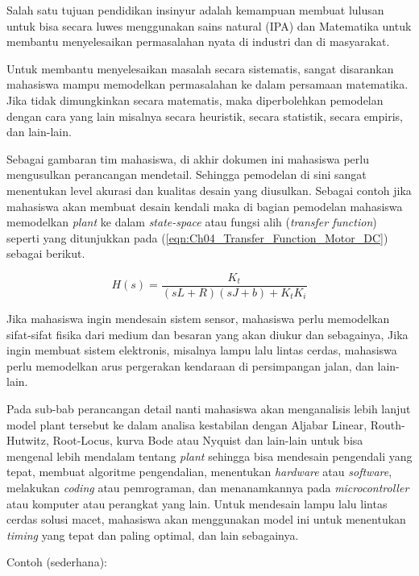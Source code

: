 Salah satu tujuan pendidikan insinyur adalah kemampuan membuat lulusan untuk bisa secara luwes menggunakan sains natural (IPA) dan Matematika untuk membantu menyelesaikan permasalahan nyata di industri dan di masyarakat.

Untuk membantu menyelesaikan masalah secara sistematis, sangat disarankan mahasiswa mampu memodelkan permasalahan ke dalam persamaan matematika. Jika tidak dimungkinkan secara matematis, maka diperbolehkan pemodelan dengan cara yang lain misalnya secara heuristik, secara statistik, secara empiris, dan lain-lain.

Sebagai gambaran tim mahasiswa, di akhir dokumen ini mahasiswa perlu mengusulkan perancangan mendetail. Sehingga pemodelan di sini sangat menentukan level akurasi dan kualitas desain yang diusulkan. Sebagai contoh jika mahasiswa akan membuat desain kendali maka di bagian pemodelan mahasiswa memodelkan \textit{plant} ke dalam \textit{state-space} atau fungsi alih (\textit{transfer function}) seperti yang ditunjukkan pada (\ref{eqn:Ch04_Transfer_Function_Motor_DC}) sebagai berikut.

\begin{equation}
    \label{eqn:Ch04_Transfer_Function_Motor_DC}
    H(s) = \dfrac{K_t}{\left( sL + R \right) \left( sJ + b \right) + K_t K_i}
\end{equation}

Jika mahasiswa ingin mendesain sistem sensor, mahasiswa perlu memodelkan sifat-sifat fisika dari medium dan besaran yang akan diukur dan sebagainya, Jika ingin membuat sistem elektronis, misalnya lampu lalu lintas cerdas, mahasiswa perlu memodelkan arus pergerakan kendaraan di persimpangan jalan, dan lain-lain.

Pada sub-bab perancangan detail nanti mahasiswa akan menganalisis lebih lanjut model plant tersebut ke dalam analisa kestabilan dengan Aljabar Linear, Routh-Hutwitz, Root-Locus, kurva Bode atau Nyquist dan lain-lain untuk bisa mengenal lebih mendalam tentang \textit{plant} sehingga bisa mendesain pengendali yang tepat, membuat algoritme pengendalian, menentukan \textit{hardware} atau \textit{software}, melakukan \textit{coding} atau pemrograman, dan menanamkannya pada \textit{microcontroller} atau komputer atau perangkat yang lain. Untuk mendesain lampu lalu lintas cerdas solusi macet, mahasiswa akan menggunakan model ini untuk menentukan \textit{timing} yang tepat dan paling optimal, dan lain sebagainya.
\vspace{6pt}

\newpage
\noindent
Contoh (sederhana):

